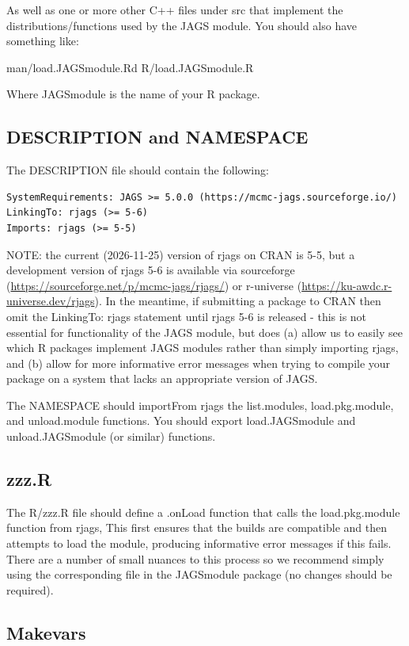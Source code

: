 \documentclass[11pt, a4paper, titlepage]{report}
\begin{document}
As well as one or more other C++ files under src that implement the
distributions/functions used by the JAGS module.  You should also
have something like:

man/load.JAGSmodule.Rd
R/load.JAGSmodule.R

Where JAGSmodule is the name of your R package.

\subsection{DESCRIPTION and NAMESPACE}

The DESCRIPTION file should contain the following:

\begin{verbatim}
SystemRequirements: JAGS >= 5.0.0 (https://mcmc-jags.sourceforge.io/)
LinkingTo: rjags (>= 5-6)
Imports: rjags (>= 5-5)
\end{verbatim}

NOTE:  the current (2026-11-25) version of rjags on CRAN is 5-5,
but a development version of rjags 5-6 is available via sourceforge
(\url{https://sourceforge.net/p/mcmc-jags/rjags/}) or r-universe
(\url{https://ku-awdc.r-universe.dev/rjags}). In the meantime, if
submitting a package to CRAN then omit the LinkingTo: rjags
statement until rjags 5-6 is released - this is not essential for
functionality of the JAGS module, but does (a) allow us to easily
see which R packages implement JAGS modules rather than
simply importing rjags, and (b) allow for more informative error
messages when trying to compile your package on a system
that lacks an appropriate version of JAGS.

The NAMESPACE should importFrom rjags the list.modules,
load.pkg.module, and unload.module functions.  You should
export load.JAGSmodule and unload.JAGSmodule (or similar)
functions.

\subsection{zzz.R}

The R/zzz.R file should define a .onLoad function that calls the
load.pkg.module function from rjags, This first ensures that
the builds are compatible and then attempts to load the module,
producing informative error messages if this fails. There are a
number of small nuances to this process so we recommend 
simply using the corresponding file in the JAGSmodule package
(no changes should be required).

\subsection{Makevars}
\end{document}
